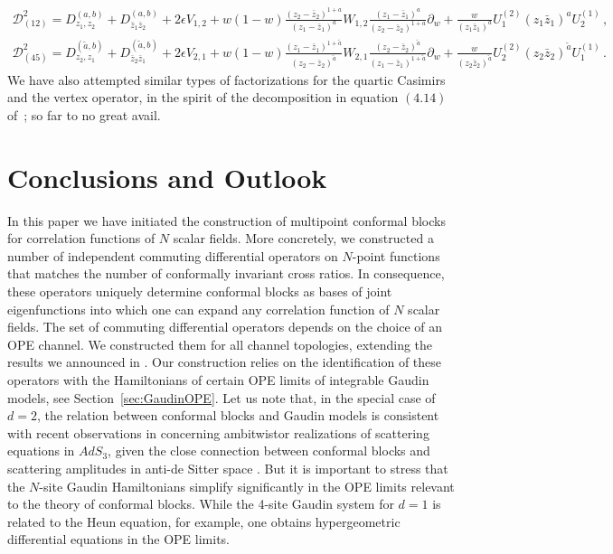\documentclass{article}
\begin{document}
    \begin{gather}
        \mathcal{D}^2_{(12)}\!=\!D_{z_1,z_2}^{(a,b)}\!+\!D_{\bar{z}_1\bar{z}_2}^{(a,b)}\!+\!2\epsilon V_{1,2}+w(1-w)\frac{(z_2-\bar{z}_2)^{1+a}}{(z_1-\bar{z}_1)^a}W_{1,2}\frac{(z_1-\bar{z}_1)^a}{(z_2-\bar{z}_2)^{1+a}}\partial_w+\frac{w}{(z_1\bar{z}_1)^a}U_1^{(2)}(z_1\bar{z}_1)^a U_2^{(1)}\,,\\
        \mathcal{D}^2_{(45)}\!=\!D_{z_2,z_1}^{(\tilde{a},b)}\!+\!D_{\bar{z}_2\bar{z}_1}^{(\tilde{a},b)}\!+\!2\epsilon V_{2,1}+w(1-w)\frac{(z_1-\bar{z}_1)^{1+\tilde{a}}}{(z_2-\bar{z}_2)^{\tilde{a}}}W_{2,1}\frac{(z_2-\bar{z}_2)^{\tilde{a}}}{(z_1-\bar{z}_1)^{1+\tilde{a}}}\partial_w+\frac{w}{(z_2\bar{z}_2)^{\tilde{a}}}U_2^{(2)}(z_2\bar{z}_2)^{\tilde{a}} U_1^{(1)}\,.
    \end{gather}
    We have also attempted similar types of factorizations for the quartic Casimirs and the vertex operator, in the spirit of the decomposition in equation $(4.14)$ of~\cite{Dolan:2011dv}; so far to no great avail.


\section{Conclusions and Outlook} 

In this paper we have initiated the construction of multipoint conformal blocks for correlation 
functions of $N$ scalar fields. More concretely, we constructed a number of independent commuting 
differential operators on $N$-point functions that matches the number of conformally invariant 
cross ratios. In consequence, these operators uniquely determine conformal blocks as bases of joint eigenfunctions into which one can expand any correlation function of $N$ scalar fields. The set of commuting differential operators depends on the choice 
of an OPE channel. We constructed them for all channel topologies, extending the results we 
announced in \cite{Buric:2020dyz}. Our construction relies on the identification of these operators with the 
Hamiltonians of certain OPE limits of integrable Gaudin models, see Section~\ref{sec:GaudinOPE}. Let us note 
that, in the special case of $d=2$, the relation between conformal blocks and Gaudin models 
is consistent with recent observations in \cite{Roehrig:2020kck} concerning ambitwistor 
realizations of scattering equations in $AdS_3$, given the close connection between conformal 
blocks and scattering amplitudes in anti-de Sitter space \cite{Hijano:2015zsa}. But it is 
important to stress that the $N$-site Gaudin Hamiltonians simplify significantly in the 
OPE limits relevant to the theory of conformal blocks. While the 4-site 
Gaudin system for $d=1$ is related to the Heun equation, for example, one obtains 
hypergeometric differential equations in the OPE limits.  
\end{document}
